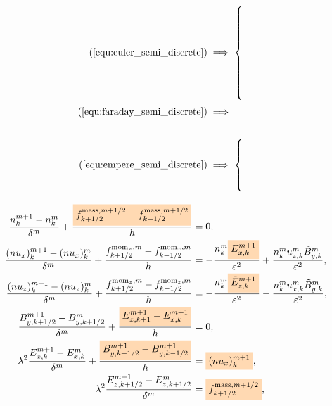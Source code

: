 \documentclass{article}
\newcommand{\mycolorbox}[2]{\colorbox{#1}{$\displaystyle#2$}}
\begin{document}
\begin{minipage}{0.1\textwidth}
\vspace{0.5cm}
    \begin{align*}
        (\ref{equ:euler_semi_discrete}) &\implies \begin{cases}
         \\
         \\
         \\
         \\
         \\
         \\
         \\
        \end{cases} \\
        (\ref{equ:faraday_semi_discrete}) & \implies \\
        \\
        (\ref{equ:empere_semi_discrete}) & \implies \begin{cases}
        \\ 
        \\
        \\
        \\
        \end{cases}
    \end{align*}
\end{minipage}
\begin{minipage}{0.6\textwidth}
\begin{align*}
  \frac{n^{m+1}_k - n^m_k}{\delta^m} + \frac{\mycolorbox{orange!30}{f^{\text{mass},m+1/2}_{k+1/2} - f^{\text{mass},m+1/2}_{k-1/2}}}{h} &= 0, \\
  \frac{(nu_x)^{m+1}_k - (nu_x)^m_k}{\delta^m} + \frac{f^{\text{mom}_x,m}_{k+1/2} - f^{\text{mom}_x,m}_{k-1/2}}{h} &= -\frac{n^m_k \mycolorbox{orange!30}{E^{m+1}_{x,k}}}{\varepsilon^2} + \frac{n^m_k u^m_{z,k}\Tilde{B}^m_{y,k}}{\varepsilon^2},\\
  \frac{(nu_z)^{m+1}_k - (nu_z)^m_k}{\delta^m} + \frac{f^{\text{mom}_z,m}_{k+1/2} - f^{\text{mom}_z,m}_{k-1/2}}{h} &= - \frac{n^m_k \mycolorbox{orange!30}{\Tilde{E}^{m+1}_{z,k}}}{\varepsilon^2} - \frac{n^m_k u^m_{x,k}\Tilde{B}^m_{y,k}}{\varepsilon^2}, \\
  \frac{B^{m+1}_{y,k+1/2} - B^{m}_{y,k+1/2}}{\delta^m} + \frac{\mycolorbox{orange!30}{E^{m+1}_{x,k+1} - E^{m+1}_{x,k}}}{h} &= 0, \\
  \lambda^2 \frac{E^{m+1}_{x,k} - E^{m}_{x,k}}{\delta^m} + \frac{\mycolorbox{orange!30}{B^{m+1}_{y,k+1/2} - B^{m+1}_{y,k-1/2}}}{h} &= \mycolorbox{orange!30}{(nu_x)^{m+1}_k}, \\
  \lambda^2 \frac{E^{m+1}_{z,k+1/2} - E^{m}_{z,k+1/2}}{\delta^m} &= \mycolorbox{orange!30}{f^{\text{mass},m+1/2}_{k+1/2}}, 
\end{align*}
\end{minipage}
\end{document}

